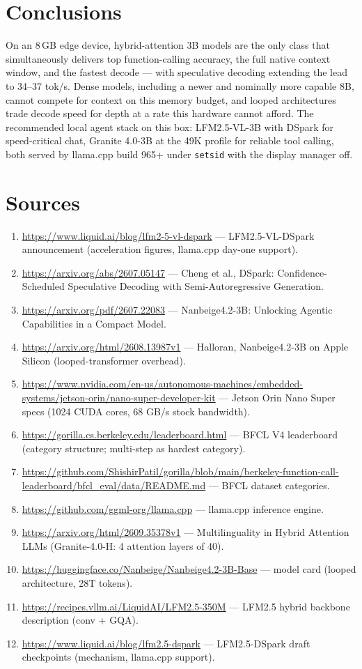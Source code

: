 \documentclass[10pt]{article}
\begin{document}
\section{Conclusions}
On an 8\,GB edge device, hybrid-attention 3B models are the only class
that simultaneously delivers top function-calling accuracy, the full
native context window, and the fastest decode --- with speculative
decoding extending the lead to 34--37 tok/s. Dense models, including a
newer and nominally more capable 8B, cannot compete for context on this
memory budget, and looped architectures trade decode speed for depth at
a rate this hardware cannot afford. The recommended local agent stack on
this box: LFM2.5-VL-3B with DSpark for speed-critical chat, Granite
4.0-3B at the 49K profile for reliable tool calling, both served by
llama.cpp build 965+ under \texttt{setsid} with the display manager off.

\section*{Sources}
\small
\begin{enumerate}
\item \url{https://www.liquid.ai/blog/lfm2-5-vl-dspark} — LFM2.5-VL-DSpark announcement (acceleration figures, llama.cpp day-one support).
\item \url{https://arxiv.org/abs/2607.05147} — Cheng et al., DSpark: Confidence-Scheduled Speculative Decoding with Semi-Autoregressive Generation.
\item \url{https://arxiv.org/pdf/2607.22083} — Nanbeige4.2-3B: Unlocking Agentic Capabilities in a Compact Model.
\item \url{https://arxiv.org/html/2608.13987v1} — Halloran, Nanbeige4.2-3B on Apple Silicon (looped-transformer overhead).
\item \url{https://www.nvidia.com/en-us/autonomous-machines/embedded-systems/jetson-orin/nano-super-developer-kit} — Jetson Orin Nano Super specs (1024 CUDA cores, 68 GB/s stock bandwidth).
\item \url{https://gorilla.cs.berkeley.edu/leaderboard.html} — BFCL V4 leaderboard (category structure; multi-step as hardest category).
\item \url{https://github.com/ShishirPatil/gorilla/blob/main/berkeley-function-call-leaderboard/bfcl_eval/data/README.md} — BFCL dataset categories.
\item \url{https://github.com/ggml-org/llama.cpp} — llama.cpp inference engine.
\item \url{https://arxiv.org/html/2609.35378v1} — Multilinguality in Hybrid Attention LLMs (Granite-4.0-H: 4 attention layers of 40).
\item \url{https://huggingface.co/Nanbeige/Nanbeige4.2-3B-Base} — model card (looped architecture, 28T tokens).
\item \url{https://recipes.vllm.ai/LiquidAI/LFM2.5-350M} — LFM2.5 hybrid backbone description (conv + GQA).
\item \url{https://www.liquid.ai/blog/lfm2.5-dspark} — LFM2.5-DSpark draft checkpoints (mechanism, llama.cpp support).
\end{enumerate}
\end{document}
